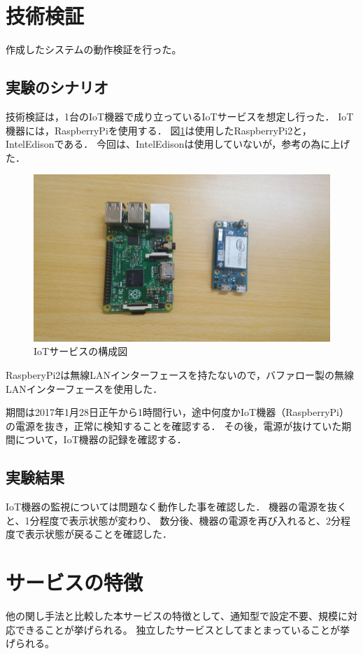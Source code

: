 \section{技術検証}
作成したシステムの動作検証を行った。

\subsection{実験のシナリオ}
技術検証は，1台のIoT機器で成り立っているIoTサービスを想定し行った．
IoT機器には，RaspberryPiを使用する．
図\ref{fig:device}は使用したRaspberryPi2と，IntelEdisonである．
今回は、IntelEdisonは使用していないが，参考の為に上げた．
\begin{figure}[htbp]
\includegraphics[width=14cm]{images/device.png}
\caption{IoTサービスの構成図}
\label{fig:device}
\end{figure}

RaspberyPi2は無線LANインターフェースを持たないので，バファロー製の無線LANインターフェースを使用した．

期間は2017年1月28日正午から1時間行い，途中何度かIoT機器（RaspberryPi）の電源を抜き，正常に検知することを確認する．
その後，電源が抜けていた期間について，IoT機器の記録を確認する．

\subsection{実験結果}
IoT機器の監視については問題なく動作した事を確認した．
機器の電源を抜くと、1分程度で表示状態が変わり、
数分後、機器の電源を再び入れると、2分程度で表示状態が戻ることを確認した．


\section{サービスの特徴}
他の関し手法と比較した本サービスの特徴として、通知型で設定不要、規模に対応できることが挙げられる。
独立したサービスとしてまとまっていることが挙げられる。


